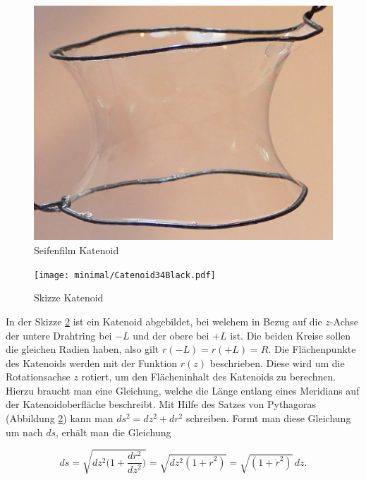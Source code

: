\begin{refsection}
\begin{figure}
  \centering
  \includegraphics[scale=0.5]{minimal/Cartenoid_Foto.png}
  \caption{Seifenfilm Katenoid} 
  \label{KatenoidSeifenfilm}
\end{figure}


\begin{figure}
  \centering
  \texttt{[image: minimal/Catenoid34Black.pdf]}
  \caption{Skizze Katenoid} 
  \label{Katenoid}
\end{figure}
In der Skizze \ref{Katenoid} ist ein Katenoid abgebildet, bei welchem in Bezug auf die $z$-Achse der untere Drahtring bei $-L$ und der obere bei $+L$ ist. 
Die beiden Kreise sollen die gleichen Radien haben, also gilt $r(-L)=r(+L)=R$. 
Die Flächenpunkte des Katenoids werden mit der Funktion $r(z)$ beschrieben. Diese wird um die Rotationsachse $z$ rotiert, um den Flächeninhalt des Katenoids zu berechnen.
Hierzu braucht man eine Gleichung, welche die Länge entlang eines Meridians auf der Katenoidoberfläche beschreibt. 
Mit Hilfe des Satzes von Pythagoras (Abbildung \ref{Katenoid}) kann man $ds^2=dz^2+dr^2$ schreiben.
Formt man diese Gleichung um nach $ds$, erhält man die Gleichung

\begin{equation} \label{ds}
  ds=\sqrt{dz^2\bigg(1+\frac{dr^2}{dz^2}\bigg)}= \sqrt{dz^2(1+\dot r^2)}=\sqrt{(1+\dot r^2)}\,dz .
\end{equation}

\end{refsection}
